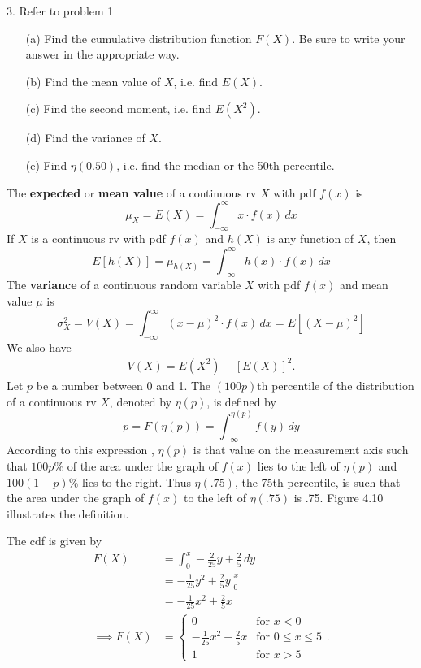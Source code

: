 \documentclass{report}
\begin{document}
 \pagebreak \bigbreak \noindent 
 \begin{mdframed}
     3. Refer to problem 1
     \begin{enumerate}
         \item[(a)] Find the cumulative distribution function $F(X)$. Be sure to write your answer in the appropriate way.
         \item[(b)] Find the mean value of $X$, i.e. find $E(X)$.
         \item[(c)] Find the second moment, i.e. find $E(X^2)$.
         \item[(d)] Find the variance of $X$.
         \item[(e)] Find $\eta(0.50)$, i.e. find the median or the 50th percentile.
     \end{enumerate}
 \end{mdframed}
 \bigbreak \noindent 
 \begin{remark}
     The \textbf{expected} or \textbf{mean value} of a continuous rv $X$ with pdf $f(x)$ is
     \[
         \mu_X = E(X) = \int_{-\infty}^{\infty} x \cdot f(x) \, dx
     \]
     \bigbreak \noindent 
     If $X$ is a continuous rv with pdf $f(x)$ and $h(X)$ is any function of $X$, then
     \[
         E[h(X)] = \mu_{h(X)} = \int_{-\infty}^{\infty} h(x) \cdot f(x) \, dx
     \]
     \bigbreak \noindent 
     The \textbf{variance} of a continuous random variable $X$ with pdf $f(x)$ and mean value $\mu$ is
     \[
         \sigma_X^2 = V(X) = \int_{-\infty}^{\infty} (x - \mu)^2 \cdot f(x) \, dx = E[(X - \mu)^2]
     \]
     We also have
     \begin{align*}
         V(X) = E(X^{2}) - \left[E(X)\right]^{2}
     .\end{align*}
     \bigbreak \noindent 
     Let $p$ be a number between 0 and 1. The $(100p)$th percentile of the distribution of a continuous rv $X$, denoted by $\eta(p)$, is defined by
     \[
         p = F(\eta(p)) = \int_{-\infty}^{\eta(p)} f(y) \, dy
     \]
     \bigbreak \noindent 
     According to this expression , $\eta(p)$ is that value on the measurement axis such that $100p\%$ of the area under the graph of $f(x)$ lies to the left of $\eta(p)$ and $100(1 - p)\%$ lies to the right. Thus $\eta(.75)$, the 75th percentile, is such that the area under the graph of $f(x)$ to the left of $\eta(.75)$ is .75. Figure 4.10 illustrates the definition.
     \smiley{}
 \end{remark}
 \bigbreak \noindent 
 The cdf is given by
 \begin{align*}
     F(X) &= \int_{0}^{x} -\frac{2}{25}y + \frac{2}{5} \, dy \\
     &=-\frac{1}{25}y^{2} +\frac{2}{5}y \bigg|^{x}_{0} \\
     &= -\frac{1}{25}x^{2} + \frac{2}{5}x \\
     \implies F(X) &=
     \begin{cases}
         0 & \text{for } x < 0 \\
         -\frac{1}{25}x^{2} + \frac{2}{5}x & \text{for } 0 \leq x \leq 5 \\   
         1 & \text{for } x > 5
    \end{cases}
 .\end{align*}
\end{document}
